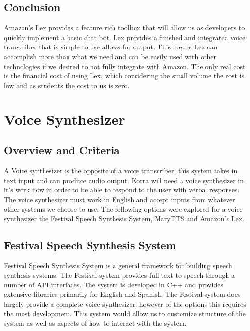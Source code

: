 \documentclass[onecolumn, draftclsnofoot,10pt, compsoc]{IEEEtran}
\begin{document}
    \subsection{Conclusion}
    Amazon's Lex provides a feature rich toolbox that will allow us as developers to quickly implement a basic chat bot. 
    Lex provides a finished and integrated voice transcriber that is simple to use allows for output.
    This means Lex can accomplish more than what we need and can be easily used with other technologies if we desired to not fully integrate with Amazon.
    The only real cost is the financial cost of using Lex, which considering the small volume the cost is low and as students the cost to us is zero.
\section{Voice Synthesizer}
	\subsection{Overview and Criteria}
    A Voice synthesizer is the opposite of a voice transcriber, this system takes in text input and can produce audio output.
    Korra will need a voice synthesizer in it's work flow in order to be able to respond to the user with verbal responses.
    The voice synthesizer must work in English and accept inputs from whatever other systems we choose to use. 
    The following options were explored for a voice synthesizer the Festival Speech Synthesis System, MaryTTS and Amazon's Lex.
    
    \subsection{Festival Speech Synthesis System }
    Festival Speech Synthesis System is a general framework for building speech synthesis systems.
    The Festival system provides full text to speech through a number of API interfaces.
    The system is developed in C++ and provides extensive libraries primarily for English and Spanish.
    The Festival system does largely provide a complete voice synthesizer, however of the options this requires the most development.
    This system would allow us to customize structure of the system as well as aspects of how to interact with the system. 
    
\end{document}
